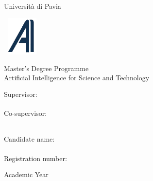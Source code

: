 \begin{titlepage}
\begin{center}
\begin{minipage}[t]{18cm}
\begin{center}
\begin{minipage}[t]{4cm}
\begin{center}
\Large Universit\`a %
di Pavia
\end{center}
\end{minipage}%
\end{center}%
\end{minipage}

\vskip 1.5cm

\begin{center}%
\begin{minipage}{2cm}%
\includegraphics[height=2cm,width=2cm]{logos/logo-ai4st-clear}%
\end{minipage}%
\begin{minipage}{12cm}%
\begin{center}%
\LARGE%
Master's Degree Programme \\
Artificial Intelligence for Science and Technology
\end{center}%
\end{minipage}%
\end{center}%


\vskip 2.5cm

\Huge
	\textbf{\printtitle}

\vskip 4.5cm

\Large

\begin{minipage}[t]{7cm}
	Supervisor:\\
	\printsupervisor \\
	Co-supervisor:\\
  	\printcosupervisor \\
\end{minipage}
\hfill
\begin{minipage}[t]{5cm}
	Candidate name:\\
	\printauthor\\
	Registration number:\\
    \regnumber
\end{minipage}

\vskip 1.5cm

	Academic Year \printacademicyear

\end{center}

\vfill
\eject
\end{titlepage}

\clearpage

\restoregeometry

